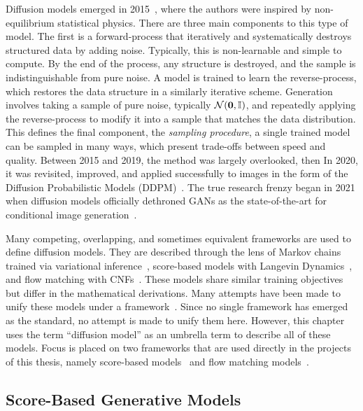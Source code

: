 Diffusion models emerged in 2015~\cite{DeepUnsupervisedLearning}, where the authors were inspired by non-equilibrium statistical physics.
There are three main components to this type of model.
The first is a forward-process that iteratively and systematically destroys structured data by adding noise.
Typically, this is non-learnable and simple to compute.
By the end of the process, any structure is destroyed, and the sample is indistinguishable from pure noise.
A model is trained to learn the reverse-process, which restores the data structure in a similarly iterative scheme.
Generation involves taking a sample of pure noise, typically $\mathcal{N}(\mathbf{0}, \mathbb{I})$,  and repeatedly applying the reverse-process to modify it into a sample that matches the data distribution.
This defines the final component, the \textit{sampling procedure}, a single trained model can be sampled in many ways, which present trade-offs between speed and quality.
Between 2015 and 2019, the method was largely overlooked, then
In 2020, it was revisited, improved, and applied successfully to images in the form of the Diffusion Probabilistic Models (DDPM)~\cite{DDPM}.
The true research frenzy began in 2021 when diffusion models officially dethroned \Glspl{GAN} as the state-of-the-art for conditional image generation~\cite{DiffusionBeatsGANS}.

Many competing, overlapping, and sometimes equivalent frameworks are used to define diffusion models.
They are described through the lens of Markov chains trained via variational inference~\cite{DDPM, DDIM}, score-based models with Langevin Dynamics~\cite{ScoreBasedGenerativeModeling, ElucidatingDesignSpace}, and flow matching with \Glspl{CNF}~\cite{BuildingNormalizingFlows, FlowMatchingGenerative, FlowStraightFast}.
These models share similar training objectives but differ in the mathematical derivations.
Many attempts have been made to unify these models under a framework~\cite{CM2, ElucidatingDesignSpace, UnderstandingDiffusionModels, StochasticInterpolants, FlowStraightFast}.
Since no single framework has emerged as the standard, no attempt is made to unify them here.
However, this chapter uses the term ``diffusion model'' as an umbrella term to describe all of these models.
Focus is placed on two frameworks that are used directly in the projects of this thesis, namely score-based models~\cite{ScoreBasedGenerativeModeling} and flow matching models~\cite{BuildingNormalizingFlows, FlowMatchingGenerative, FlowStraightFast}.

\subsection{Score-Based Generative Models}
\label{sec:score_based}

